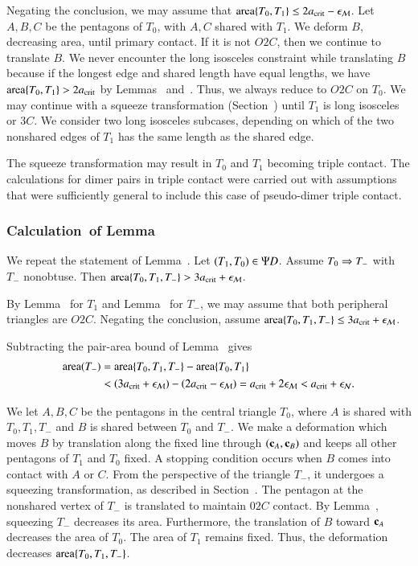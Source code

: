 Negating the conclusion, we may assume that
${\operatorname{area}}\{T_0,T_1\}\le2a_\text{crit}-\epsilon_{\mathcal M}$.  Let $A,B,C$ be the pentagons of $T_0$, with $A,C$
shared with $T_1$.  We deform $B$, decreasing area, until primary contact.  If it is not
$O2C$, then we continue to translate $B$.  We never encounter the long
isosceles constraint while translating $B$ because if the longest edge
and shared length have equal lengths, we have ${\operatorname{area}}\{T_0,T_1\} >
2a_\text{crit}$ by Lemmas~ and~.  Thus,
we always reduce to $O2C$ on $T_0$.  We may continue with a squeeze
transformation (Section~) until $T_1$ is long
isosceles or $3C$.  We consider two long isosceles subcases, depending
on which of the two nonshared edges of $T_1$ has the same length as the
shared edge.

The squeeze transformation may result in $T_0$ and $T_1$ becoming
triple contact.  The calculations for dimer pairs in triple contact
were carried out with assumptions that were sufficiently general to
include this case of pseudo-dimer triple contact.

\subsubsection{Calculation~of Lemma~}

We repeat the statement of Lemma~.  Let
$(T_1,T_0)\in\Psi D$. Assume $T_0\Rightarrow T_-$ with $T_-$ nonobtuse.  Then ${\operatorname{area}}\{T_0,T_1,T_-\} >
3a_\text{crit} + \epsilon_{\mathcal M}$. %

By Lemma~ for $T_1$ and
Lemma~ for $T_-$, we may assume that both
peripheral triangles are $O2C$.  Negating the conclusion, assume
${\operatorname{area}}\{T_0,T_1,T_-\}\le3a_\text{crit}+\epsilon_{\mathcal M}$.

Subtracting the pair-area bound of
Lemma~ gives
\begin{align*}
{\operatorname{area}}(T_-) &= {\operatorname{area}}\{T_0,T_1,T_-\} - {\operatorname{area}}\{T_0,T_1\} \\
&< (3a_\text{crit}+\epsilon_{\mathcal M}) - (2a_\text{crit} - \epsilon_{\mathcal M}) = a_\text{crit} + 2\epsilon_{\mathcal M} < a_\text{crit}+\epsilon_{\mathcal N}.
\end{align*}

We let $A,B,C$ be the pentagons in the central triangle $T_0$, where
$A$ is shared with $T_0,T_1,T_-$ and $B$ is shared between $T_0$ and
$T_-$.  We make a deformation which moves $B$ by translation along the
fixed line through $({\mathbf c}_A,{\mathbf c}_B)$ and keeps all other pentagons of
$T_1$ and $T_0$ fixed.  A stopping condition occurs when $B$ comes
into contact with $A$ or $C$.  From the perspective of the triangle
$T_-$, it undergoes a squeezing transformation, as described in
Section~.  The pentagon at the nonshared vertex of
$T_-$ is translated to maintain $02C$ contact.  By
Lemma~, squeezing $T_-$ decreases its area.
Furthermore, the translation of $B$ toward ${\mathbf c}_A$ decreases the area
of $T_0$.  The area of $T_1$ remains fixed.  Thus, the deformation
decreases ${\operatorname{area}}\{T_0,T_1,T_-\}$.

